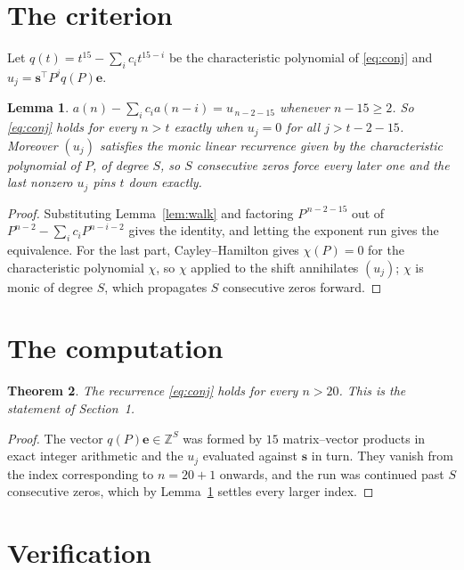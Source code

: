\documentclass[11pt,a4paper]{article}
\theoremstyle{plain}
\newtheorem{theorem}{Theorem}
\newtheorem{lemma}[theorem]{Lemma}
\theoremstyle{definition}
\begin{document}
\section{The criterion}

Let $q(t)=t^{15}-\sum_i c_i t^{15-i}$ be the characteristic polynomial of
\eqref{eq:conj} and $u_j=\mathbf{s}^{\!\top}P^{j}q(P)\mathbf{e}$.

\begin{lemma}\label{lem:crit}
$a(n)-\sum_i c_i a(n-i)=u_{\,n-2-15}$ whenever $n-15\ge2$. So \eqref{eq:conj}
holds for every $n>t$ exactly when $u_j=0$ for all $j>t-2-15$. Moreover $(u_j)$
satisfies the monic linear recurrence given by the characteristic polynomial of $P$, of
degree $S$, so $S$ consecutive zeros force every later one and the last nonzero $u_j$ pins
$t$ down exactly.
\end{lemma}

\begin{proof}
Substituting Lemma~\ref{lem:walk} and factoring $P^{\,n-2-15}$ out of
$P^{n-2}-\sum_i c_i P^{n-i-2}$ gives the identity, and letting the exponent run gives the
equivalence. For the last part, Cayley--Hamilton gives $\chi(P)=0$ for the characteristic
polynomial $\chi$, so $\chi$ applied to the shift annihilates $(u_j)$; $\chi$ is monic of
degree $S$, which propagates $S$ consecutive zeros forward.
\end{proof}

\section{The computation}

\begin{theorem}
The recurrence \eqref{eq:conj} holds for every $n>20$. This is the statement of
Section~1.
\end{theorem}

\begin{proof}
The vector $q(P)\mathbf{e}\in\mathbb{Z}^{S}$ was formed by $15$ matrix--vector
products in exact integer arithmetic and the $u_j$ evaluated against $\mathbf{s}$ in turn.
They vanish from the index corresponding to $n=20+1$ onwards, and the run was continued
past $S$ consecutive zeros, which by Lemma~\ref{lem:crit} settles every larger index.
\end{proof}

\section{Verification}
\end{document}

